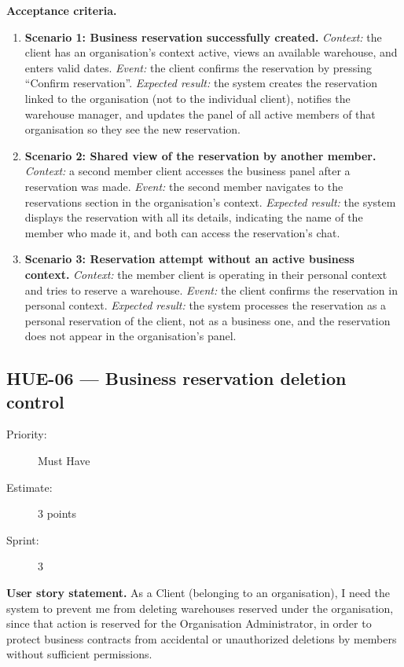 \documentclass[11pt,a4paper,oneside]{report}
\begin{document}
\textbf{Acceptance criteria.}
\begin{enumerate}
\item \textbf{Scenario 1: Business reservation successfully created.} \emph{Context:} the client has an organisation's context active, views an available warehouse, and enters valid dates. \emph{Event:} the client confirms the reservation by pressing ``Confirm reservation''. \emph{Expected result:} the system creates the reservation linked to the organisation (not to the individual client), notifies the warehouse manager, and updates the panel of all active members of that organisation so they see the new reservation.
\item \textbf{Scenario 2: Shared view of the reservation by another member.} \emph{Context:} a second member client accesses the business panel after a reservation was made. \emph{Event:} the second member navigates to the reservations section in the organisation's context. \emph{Expected result:} the system displays the reservation with all its details, indicating the name of the member who made it, and both can access the reservation's chat.
\item \textbf{Scenario 3: Reservation attempt without an active business context.} \emph{Context:} the member client is operating in their personal context and tries to reserve a warehouse. \emph{Event:} the client confirms the reservation in personal context. \emph{Expected result:} the system processes the reservation as a personal reservation of the client, not as a business one, and the reservation does not appear in the organisation's panel.
\end{enumerate}

\subsection{HUE-06 --- Business reservation deletion control}
\label{req:HUE-06}
\begin{description}
\item[Priority:] Must Have \quad \item[Estimate:] 3 points \quad \item[Sprint:] 3
\end{description}

\textbf{User story statement.} As a Client (belonging to an organisation), I need the system to prevent me from deleting warehouses reserved under the organisation, since that action is reserved for the Organisation Administrator, in order to protect business contracts from accidental or unauthorized deletions by members without sufficient permissions.
\end{document}
